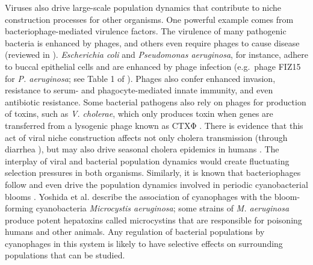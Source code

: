 \documentclass[review,draft,12pt]{elsarticle}
\begin{document}
Viruses also drive large-scale population dynamics that contribute to
niche construction processes for other organisms. One powerful example
comes from bacteriophage-mediated virulence factors. The virulence of
many pathogenic bacteria is enhanced by phages, and others even require
phages to cause disease (reviewed in \citep{Wagner:2002wb}).
\emph{Escherichia coli} and \emph{Pseudomonas aeruginosa}, for instance,
adhere to buccal epithelial cells and are enhanced by phage infection
(e.g.~phage FIZ15 for \emph{P. aeruginosa}; see Table 1 of
\citep{Wagner:2002wb}). Phages also confer enhanced invasion, resistance
to serum- and phagocyte-mediated innate immunity, and even antibiotic
resistance. Some bacterial pathogens also rely on phages for production
of toxins, such as \emph{V. cholerae}, which only produces toxin when
genes are transferred from a lysogenic phage known as CTXΦ
\citep{Wagner:2002wb}. There is evidence that this act of viral niche
construction affects not only cholera transmission (through diarrhea
\citep{Wagner:2002wb}), but may also drive seasonal cholera epidemics in
humans \citep{Faruque:2005gl}. The interplay of viral and bacterial
population dynamics would create fluctuating selection pressures in both
organisms. Similarly, it is known that bacteriophages follow and even
drive the population dynamics involved in periodic cyanobacterial blooms
\citep{Bratbak:1990pi}. Yoshida et al. \citep{Yoshida:2008zp} describe
the association of cyanophages with the bloom-forming cyanobacteria
\emph{Microcystis aeruginosa}; some strains of \emph{M. aeruginosa}
produce potent hepatoxins called microcystins that are responsible for
poisoning humans and other animals. Any regulation of bacterial
populations by cyanophages in this system is likely to have selective
effects on surrounding populations that can be studied.
\end{document}
